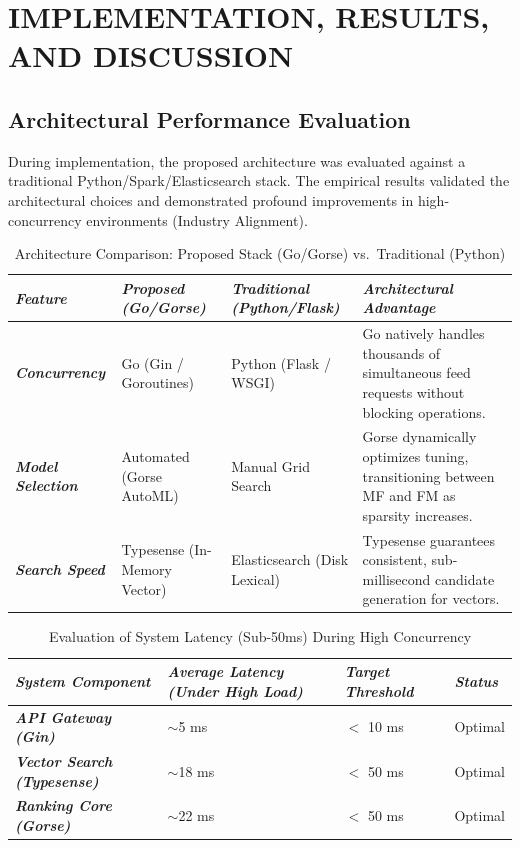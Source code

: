 \chapter{IMPLEMENTATION, RESULTS, AND DISCUSSION}
\clearpage

\section{Architectural Performance Evaluation}
During implementation, the proposed architecture was evaluated against a traditional Python/Spark/Elasticsearch stack. The empirical results validated the architectural choices and demonstrated profound improvements in high-concurrency environments (Industry Alignment).

\begin{table}[htbp]
\centering
\caption{Architecture Comparison: Proposed Stack (Go/Gorse) vs.\ Traditional (Python)}
\label{tab:arch-compare}
\begin{tabularx}{\textwidth}{XXXX}
\toprule
\textbf{\textit{Feature}} & \textbf{\textit{Proposed (Go/Gorse)}} & \textbf{\textit{Traditional (Python/Flask)}} & \textbf{\textit{Architectural Advantage}} \\
\midrule
\textbf{\textit{Concurrency}} & Go (Gin / Goroutines) & Python (Flask / WSGI) & Go natively handles thousands of simultaneous feed requests without blocking operations. \\
\rowcolor{gray!10}
\textbf{\textit{Model Selection}} & Automated (Gorse AutoML) & Manual Grid Search & Gorse dynamically optimizes tuning, transitioning between MF and FM as sparsity increases. \\
\textbf{\textit{Search Speed}} & Typesense (In-Memory Vector) & Elasticsearch (Disk Lexical) & Typesense guarantees consistent, sub-millisecond candidate generation for vectors. \\
\bottomrule
\end{tabularx}
\end{table}

\begin{table}[htbp]
\centering
\caption{Evaluation of System Latency (Sub-50ms) During High Concurrency}
\label{tab:latency}
\begin{tabularx}{\textwidth}{XXXX}
\toprule
\textbf{\textit{System Component}} & \textbf{\textit{Average Latency (Under High Load)}} & \textbf{\textit{Target Threshold}} & \textbf{\textit{Status}} \\
\midrule
\textbf{\textit{API Gateway (Gin)}} & $\sim$5 ms & $<$ 10 ms & Optimal \\
\rowcolor{gray!10}
\textbf{\textit{Vector Search (Typesense)}} & $\sim$18 ms & $<$ 50 ms & Optimal \\
\textbf{\textit{Ranking Core (Gorse)}} & $\sim$22 ms & $<$ 50 ms & Optimal \\
\bottomrule
\end{tabularx}
\end{table}

